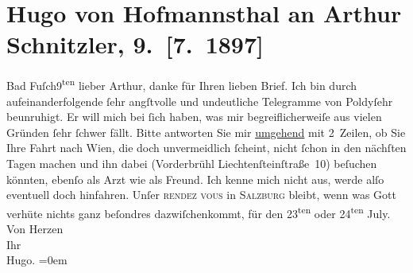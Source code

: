 

         
         \renewcommand{\erwaehntePersonen}{Personen: Leopold von Andrian-Werburg}
         \renewcommand{\erwaehnteOrte}{Orte: Bad Fusch, Bad Ischl, Liechtensteinstraße, Salzburg, Wien}
         \renewcommand{\erwaehnteWerke}{}
               \section[Hugo von Hofmannsthal an Arthur Schnitzler, 9. {[}7. 1897{]}]{ Hugo von Hofmannsthal an Arthur Schnitzler, 9. {[}7. 1897{]}}\nopagebreak{}\rehead{ }\begin{ledgroupsized}[t]{13cm}\normalsize\beginnumbering \toendnotes[C]{\smallbreak\pagebreak[2]} 
\pstart
           \raggedleft{}{\pb}Bad Fuſch9\textsuperscript{ten}\pend
           \pstart
           lieber Arthur, danke für Ihren lieben Brief. Ich bin durch
                    aufeinanderfolgende ſehr angſtvolle und undeutliche Telegramme von Poldyſehr beunruhigt. Er will mich bei ſich
                    haben, was mir begreiflicherweiſe aus vielen Gründen ſehr ſchwer fällt. Bitte
                    antworten Sie mir \uline{umgehend} mit 2 Zeilen, ob Sie
                    Ihre Fahrt nach Wien, die doch unvermeidlich
                    ſcheint, nicht ſchon in den nächſten {\pb}Tagen machen und ihn dabei
                        (Vorderbrühl Liechtenſteinſtraße 10)
                    beſuchen könnten, ebenſo als Arzt wie als Freund. Ich kenne mich nicht aus,
                    werde alſo eventuell doch hinfahren.\pend
           \pstart
           Unſer \textsc{rendez vous} in \textsc{Salzburg} bleibt, wenn was Gott verhüte nichts ganz beſondres
                    dazwiſchenkommt, für den 23\textsuperscript{ten} oder 24\textsuperscript{ten} July.\pend
           \pstart
           Von Herzen{\\[\baselineskip]}Ihr{\\[\baselineskip]}\spacefill\mbox{Hugo.}\pend
           \leftskip=0em{}
         
         \endnumbering{}\end{ledgroupsized}  \newcommand{\dateiname}{L00697}\newcommand{\titel}{Hugo von Hofmannsthal an Arthur Schnitzler, 9. [7. 1897]}\newcommand{\editorInnen}{Martin Anton Müller und Gerd-Hermann Susen}
      